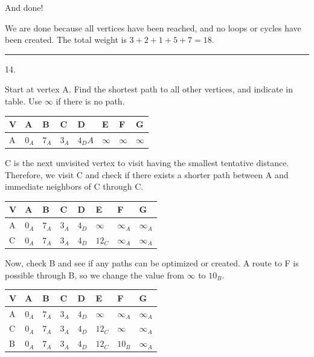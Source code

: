 \documentclass{article}
\begin{document}
And done!




We are done because all vertices have been reached, and no loops or cycles have been created. The total weight is $3+2+1+5+7=\boxed{18}$.






\noindent\rule{8cm}{0.4pt}

14. 

Start at vertex A. Find the shortest path to all other vertices, and indicate in table. Use $\infty$ if there is no path. 


\begin{table}[H]
\begin{tabular}{|l|l|l|l|l|l|l|l|}
\hline
V & \textbf{A} & B & C & D & E & F & G \\ \hline
A & $0_A$ & $7_A$ & $3_A$ & $4_DA$ & $\infty$ & $\infty$ & $\infty$ \\ \hline
\end{tabular}
\end{table}

C is the next unvisited vertex to visit having the smallest tentative distance. Therefore, we visit C and check if there exists a shorter path between A and immediate neighbors of C through C. 



\begin{table}[H]
\begin{tabular}{|l|l|l|l|l|l|l|l|}
\hline
V & \textbf{A} & B & \textbf{C} & D & E & F & G \\ \hline
A & $0_A$ & $7_A$ & $3_A$ & $4_D$ & $\infty$ & $\infty_A$ & $\infty_A$ \\ \hline
C & $0_A$ & $7_A$ & $3_A$ & $4_D$ & $12_C$ & $\infty_A$ & $\infty_A$ \\ \hline
\end{tabular}
\end{table}

Now, check B and see if any paths can be optimized or created. A route to F is possible through B, so we change the value from $\infty$ to $10_B$. 

\begin{table}[H]
\begin{tabular}{|l|l|l|l|l|l|l|l|}
\hline
V & \textbf{A} & \textbf{B} & \textbf{C} & D & E & F & G \\ \hline
A & $0_A$ & $7_A$ & $3_A$ & $4_D$ & $\infty$ & $\infty_A$ & $\infty_A$ \\ \hline
C & $0_A$ & $7_A$ & $3_A$ & $4_D$ & $12_C$ & $\infty$ & $\infty_A$ \\ \hline
B & $0_A$ & $7_A$ & $3_A$ & $4_D$ & $12_C$ & $10_B$ & $\infty_A$ \\ \hline
\end{tabular}
\end{table}
\end{document}
